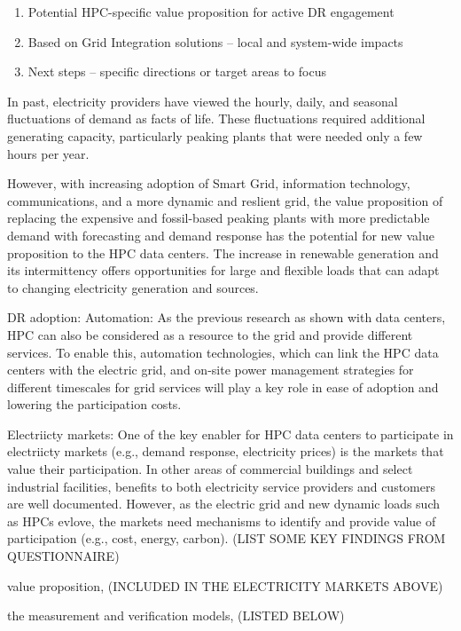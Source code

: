 %
\begin{enumerate}
\item Potential HPC-specific value proposition for active DR engagement
\item Based on Grid Integration solutions -- local and system-wide impacts
\item Next steps -- specific directions or target areas to focus
\end{enumerate}

In past, electricity providers have viewed the hourly, daily, and seasonal
fluctuations of demand as facts of life. These fluctuations required
additional generating capacity, particularly peaking plants that were needed
only a few hours per year. 

However, with increasing adoption of Smart Grid, information technology, communications, and a more dynamic and reslient grid, 
the value proposition of replacing the expensive and fossil-based peaking plants with more predictable demand with forecasting and demand response has the potential for new value proposition to the HPC data centers. 
The increase in renewable generation and its intermittency offers opportunities for large and flexible loads that can adapt to changing electricity generation and sources.

DR adoption: 
Automation: 
%
As the previous research as shown with data centers, HPC can also be considered as a resource to the grid and provide different services.
To enable this, automation technologies, which can link the HPC data centers with the electric grid, 
and on-site power management strategies for different timescales for grid services will play a key role in ease of adoption and lowering the participation costs.

Electriicty markets: 
One of the key enabler for HPC data centers to participate in electriicty markets (e.g., demand response, electricity prices)
is the markets that value their participation. 
In other areas of commercial buildings and select industrial facilities, benefits to both electricity service providers and customers are well documented.
However, as the electric grid and new dynamic loads such as HPCs evlove, the markets need mechanisms to identify and provide value of participation (e.g., cost, energy, carbon). 
(LIST SOME KEY FINDINGS FROM QUESTIONNAIRE)

value proposition, (INCLUDED IN THE ELECTRICITY MARKETS ABOVE)

the measurement and verification models, (LISTED BELOW)

